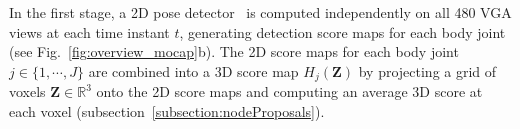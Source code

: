 In the first stage, a 2D pose detector~\cite{Wei-2016} is computed independently on all 480 VGA views at each time instant $t$, generating detection score maps for each body joint (see Fig.~\ref{fig:overview_mocap}b). The 2D score maps for each body joint~$j\in\{1,\cdots,J\}$ are combined into a 3D score map $H_j(\mathbf{Z})$ by projecting a grid of voxels $\mathbf{Z}\in \mathds{R}^3$ onto the 2D score maps and computing an average 3D score at each voxel (subsection~\ref{subsection:nodeProposals}).


